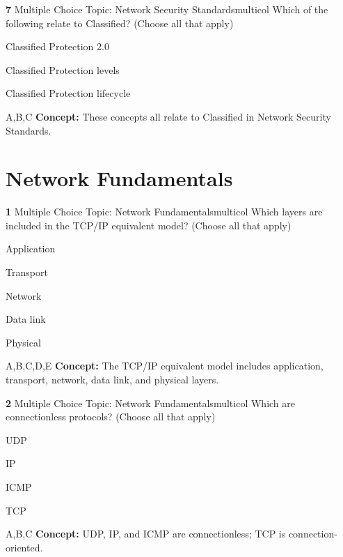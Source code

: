 \documentclass[10pt,a4paper]{article}
\begin{document}
\begin{qcard}{\color{white}\textbf{7} \hfill \small Multiple Choice \textbar{} Topic: Network Security Standards}{multicol}
Which of the following relate to Classified? (Choose all that apply)

\begin{qoptions}
\item Classified Protection 2.0
\item Classified Protection levels
\item Classified Protection lifecycle
\end{qoptions}
\begin{explainbox}{A,B,C}
\textbf{Concept:} These concepts all relate to Classified in Network Security Standards.
\end{explainbox}
\end{qcard}

\section{Network Fundamentals}
\begin{qcard}{\color{white}\textbf{1} \hfill \small Multiple Choice \textbar{} Topic: Network Fundamentals}{multicol}
Which layers are included in the TCP/IP equivalent model? (Choose all that apply)

\begin{qoptions}
\item Application
\item Transport
\item Network
\item Data link
\item Physical
\end{qoptions}
\begin{explainbox}{A,B,C,D,E}
\textbf{Concept:} The TCP/IP equivalent model includes application, transport, network, data link, and physical layers.
\end{explainbox}
\end{qcard}

\begin{qcard}{\color{white}\textbf{2} \hfill \small Multiple Choice \textbar{} Topic: Network Fundamentals}{multicol}
Which are connectionless protocols? (Choose all that apply)

\begin{qoptions}
\item UDP
\item IP
\item ICMP
\item TCP
\end{qoptions}
\begin{explainbox}{A,B,C}
\textbf{Concept:} UDP, IP, and ICMP are connectionless; TCP is connection-oriented.
\end{explainbox}
\end{qcard}
\end{document}

